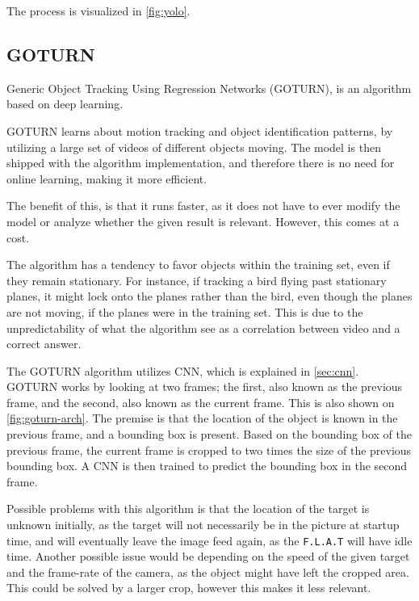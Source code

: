 The process is visualized in \autoref{fig:yolo}.


\subsection{GOTURN}
Generic Object Tracking Using Regression Networks (GOTURN), is an algorithm based on deep learning\cite{goturn}.

GOTURN learns about motion tracking and object identification patterns, by utilizing a large set of videos of different objects moving.
The model is then shipped with the algorithm implementation, and therefore there is no need for online learning, making it more efficient.


The benefit of this, is that it runs faster, as it does not have to ever modify the model or analyze whether the given result is relevant.
However, this comes at a cost. 


The algorithm has a tendency to favor objects within the training set, even if they remain stationary.
For instance, if tracking a bird flying past stationary planes, it might lock onto the planes rather than the bird, even though the planes are not moving, if the planes were in the training set.
This is due to the unpredictability of what the algorithm see as a correlation between video and a correct answer.


The GOTURN algorithm utilizes CNN, which is explained in \autoref{sec:cnn}.
GOTURN works by looking at two frames; the first, also known as the previous frame, and the second, also known as the current frame.
This is also shown on \autoref{fig:goturn-arch}.
The premise is that the location of the object is known in the previous frame, and a bounding box is present.
Based on the bounding box of the previous frame, the current frame is cropped to two times the size of the previous bounding box.
A CNN is then trained to predict the bounding box in the second frame.

Possible problems with this algorithm is that the location of the target is unknown initially, as the target will not necessarily be in the picture at startup time, and will eventually leave the image feed again, as the \texttt{F.L.A.T} will have idle time.
Another possible issue would be depending on the speed of the given target and the frame-rate of the camera, as the object might have left the cropped area. 
This could be solved by a larger crop, however this makes it less relevant.

